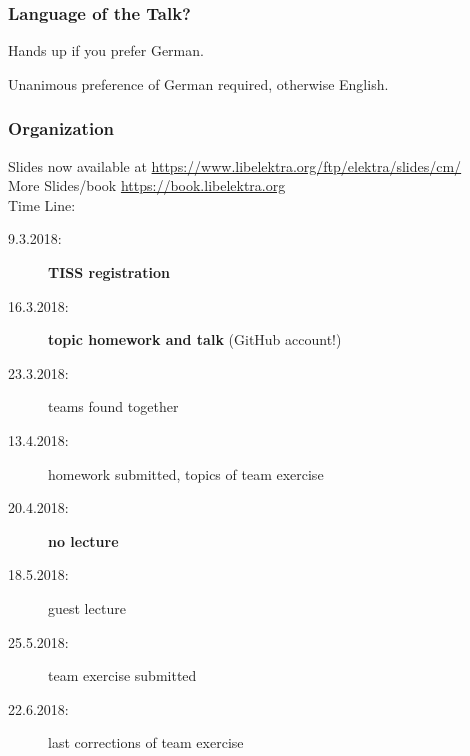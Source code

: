 


\date{9.3.2018}



\renewcommand{\enquote}[1]{\emph{``#1''}} %

\begin{frame}
	\titlepage
	\doclicenseThis
\end{frame}

\begin{assignment}
	\frametitle{Language of the Talk?}
	\begin{task}
	Hands up if you prefer German.
	\end{task}
	Unanimous preference of German required, otherwise English.
\end{assignment}

\begin{frame}
	\frametitle{Organization}
	Slides now available at
	\url{https://www.libelektra.org/ftp/elektra/slides/cm/}
	\\[1cm]

	More Slides/book
	\url{https://book.libelektra.org}
	\\[1cm]
	Time Line:
	\begin{description}
		\item[9.3.2018:] \textbf{TISS registration}
		\item[16.3.2018:] \textbf{topic homework and talk} (GitHub account!)
		\item[23.3.2018:] teams found together
		\item[13.4.2018:] homework submitted, topics of team exercise
		\item[20.4.2018:] \textbf{no lecture}

		\item[18.5.2018:] guest lecture
		\item[25.5.2018:] team exercise submitted
		\item[22.6.2018:] last corrections of team exercise
	\end{description}
\end{frame}


